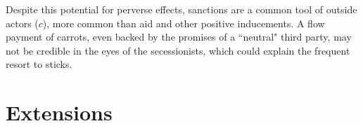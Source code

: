 \documentclass[11pt,letterpaper, notitlepage]{article}
\begin{document}



Despite this potential for perverse effects, sanctions are a common tool of outside actors ($c$), more common than aid and other positive inducements. A flow payment of carrots, even backed by the promises of a ``neutral" third party, may not be credible in the eyes of the secessionists, which could explain the frequent resort to sticks.


\section{Extensions}
\label{sec:ext}
\end{document}
